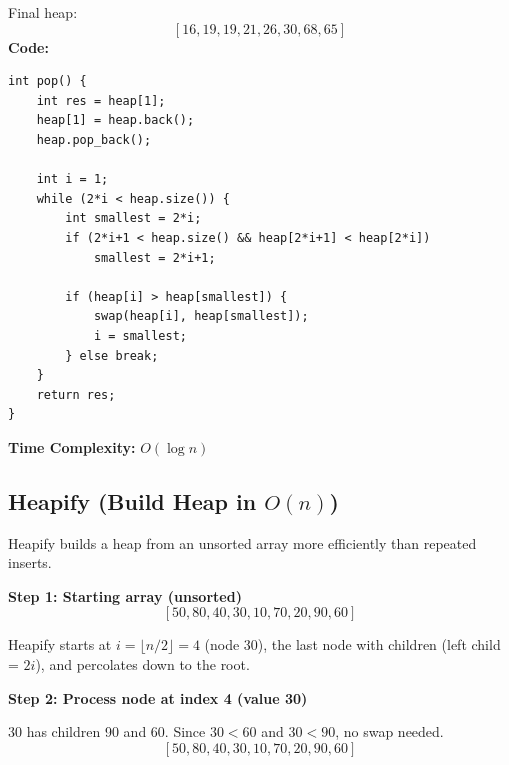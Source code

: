\documentclass{article}
\begin{document}
Final heap:
\[
[16,19,19,21,26,30,68,65]
\]
\textbf{Code:}
\begin{verbatim}
int pop() {
    int res = heap[1];
    heap[1] = heap.back();
    heap.pop_back();

    int i = 1;
    while (2*i < heap.size()) {
        int smallest = 2*i;
        if (2*i+1 < heap.size() && heap[2*i+1] < heap[2*i])
            smallest = 2*i+1;

        if (heap[i] > heap[smallest]) {
            swap(heap[i], heap[smallest]);
            i = smallest;
        } else break;
    }
    return res;
}
\end{verbatim}

\textbf{Time Complexity:} $O(\log n)$

\subsection{Heapify (Build Heap in $O(n)$)}
Heapify builds a heap from an unsorted array more efficiently than repeated inserts.

\textbf{Step 1: Starting array (unsorted)}
\[
[50,80,40,30,10,70,20,90,60]
\]
\begin{center}
\end{center}
Heapify starts at $i = \lfloor n/2 \rfloor = 4$ (node 30), the last node with children (left child = $2i$), and percolates down to the root.

\textbf{Step 2: Process node at index 4 (value 30)}

30 has children 90 and 60. Since $30 < 60$ and $30 < 90$, no swap needed.
\[
[50,80,40,30,10,70,20,90,60]
\]
\begin{center}
\end{center}
\end{document}
